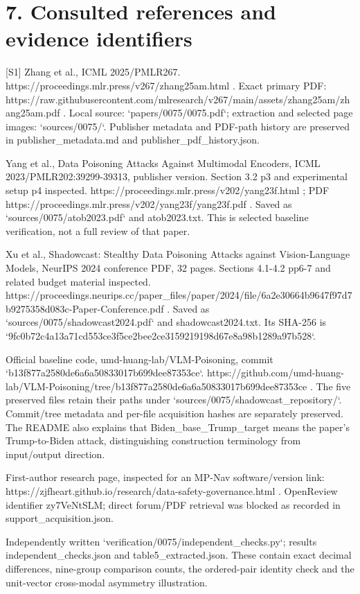 \documentclass[10pt]{article}
\begin{document}
\section*{7. Consulted references and evidence identifiers}
[S1] Zhang et al., ICML 2025/PMLR267. https://proceedings.mlr.press/v267/zhang25am.html . Exact primary PDF: https://raw.githubusercontent.com/mlresearch/v267/main/assets/zhang25am/zhang25am.pdf . Local source: `papers/0075/0075.pdf`; extraction and selected page images: `sources/0075/`. Publisher metadata and PDF-path history are preserved in publisher\_metadata.md and publisher\_pdf\_history.json.\par
[S2] Yang et al., Data Poisoning Attacks Against Multimodal Encoders, ICML 2023/PMLR202:39299-39313, publisher version. Section 3.2 p3 and experimental setup p4 inspected. https://proceedings.mlr.press/v202/yang23f.html ; PDF https://proceedings.mlr.press/v202/yang23f/yang23f.pdf . Saved as `sources/0075/atob2023.pdf` and atob2023.txt. This is selected baseline verification, not a full review of that paper.\par
[S3] Xu et al., Shadowcast: Stealthy Data Poisoning Attacks against Vision-Language Models, NeurIPS 2024 conference PDF, 32 pages. Sections 4.1-4.2 pp6-7 and related budget material inspected. https://proceedings.neurips.cc/paper\_files/paper/2024/file/6a2e30664b9647f97d7b9275358d083c-Paper-Conference.pdf . Saved as `sources/0075/shadowcast2024.pdf` and shadowcast2024.txt. Its SHA-256 is `9fc0b72c4a13a71cd553ce3f5ce2bee2ce3159219198d67e8a98b1289a97b528`.\par
[S4] Official baseline code, umd-huang-lab/VLM-Poisoning, commit `b13f877a2580de6a6a50833017b699dee87353ce`. https://github.com/umd-huang-lab/VLM-Poisoning/tree/b13f877a2580de6a6a50833017b699dee87353ce . The five preserved files retain their paths under `sources/0075/shadowcast\_repository/`. Commit/tree metadata and per-file acquisition hashes are separately preserved. The README also explains that Biden\_base\_Trump\_target means the paper’s Trump-to-Biden attack, distinguishing construction terminology from input/output direction.\par
[S5] First-author research page, inspected for an MP-Nav software/version link: https://zjfheart.github.io/research/data-safety-governance.html . OpenReview identifier zy7VeNtSLM; direct forum/PDF retrieval was blocked as recorded in support\_acquisition.json.\par
[C1] Independently written `verification/0075/independent\_checks.py`; results independent\_checks.json and table5\_extracted.json. These contain exact decimal differences, nine-group comparison counts, the ordered-pair identity check and the unit-vector cross-modal asymmetry illustration.\par
\end{document}
